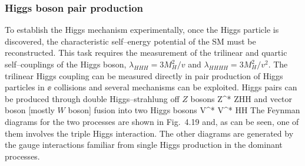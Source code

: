 {\subsubsection{Higgs boson pair production}

To establish the Higgs mechanism experimentally, once the Higgs particle is
discovered, the characteristic self--energy potential of the SM  must be 
reconstructed. This task requires the measurement of the trilinear and
quartic self--couplings of the Higgs boson, $\lambda_{HHH}=3 M_H^2/v$ 
and  $\lambda_{HHHH}=3 M_H^2/v^2$. The trilinear Higgs coupling can be 
measured directly in pair production of Higgs particles in $\ee$ collisions 
and several mechanisms can be exploited. Higgs pairs can be produced 
through double Higgs--strahlung off $Z$ bosons 
\cite{ee-HHZ,HH-Barger,ee-DKMZ,ee-H3-pheno}
\beq 
\ee \to Z^* \lra ZHH
\eeq
and vector boson [mostly $W$ boson] fusion into two Higgs bosons 
\cite{pp-VVHH,HH-Barger,ee-DKMZ}
\beq
\ee \to V^* V^* \lra \ell \ell HH
\eeq 
The Feynman diagrams for the two processes are shown in Fig.~4.19 and, as can 
be seen, one of them involves the triple Higgs interaction. The other
diagrams  are generated by the gauge interactions familiar
from single Higgs production in the dominant processes.\s

}

